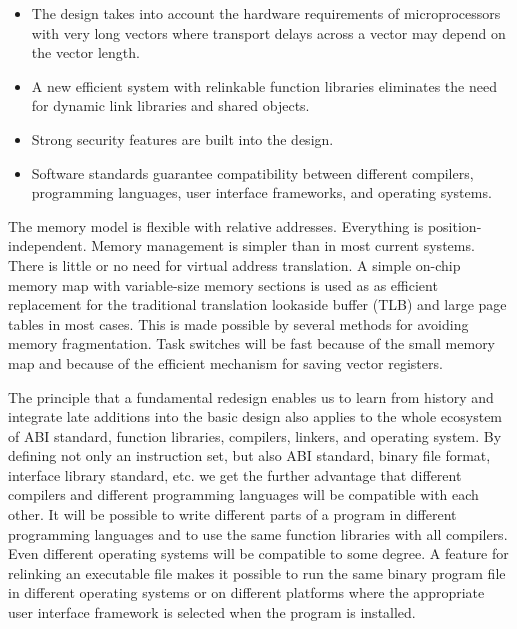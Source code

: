 \documentclass[forwardcom.tex]{subfiles}
\begin{document}
\begin{itemize}
\item The design takes into account the hardware requirements of microprocessors with very long vectors where transport delays across a vector may depend on the vector length.

\item A new efficient system with relinkable function libraries eliminates the need for dynamic link libraries and shared objects. 

\item Strong security features are built into the design.

\item Software standards guarantee compatibility between different compilers, programming languages, user interface frameworks, and operating systems.

\end{itemize}

The memory model is flexible with relative addresses. Everything is position-independent. Memory management is simpler than in most current systems. 
There is little or no need for virtual address translation. 
A simple on-chip memory map with variable-size memory sections is used as as 
efficient replacement for the traditional translation lookaside buffer (TLB) 
and large page tables in most cases. This is made possible by several methods 
for avoiding memory fragmentation. 
Task switches will be fast because of the small memory map and because of the efficient mechanism for saving vector registers. 
\vv

The principle that a fundamental redesign enables us to learn from history and integrate late additions into the basic design also applies to the whole ecosystem of ABI standard, function libraries, compilers, linkers, and operating system. By defining not only an instruction set, but also ABI standard, binary file format, interface library standard, etc. we get the further advantage that different compilers and different programming languages will be compatible with each other. It will be possible to write different parts of a program in different programming languages and to use the same function libraries with all compilers. Even different operating systems will be compatible to some degree. A feature for relinking an executable file makes it possible to run the same binary program file in different operating systems or on different platforms where the appropriate user interface framework is selected when the program is installed.
\vv
\end{document}
